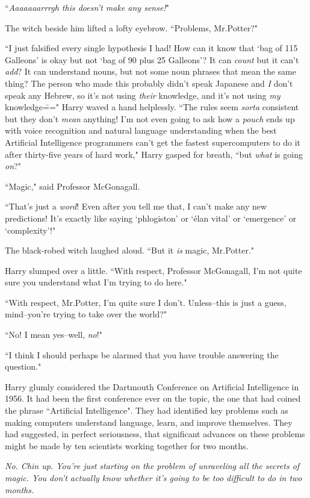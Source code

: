 ``\emph{Aaaaaaarrrgh this doesn't make any sense!}"

The witch beside him lifted a lofty eyebrow. ``Problems, Mr.\?Potter?"

``I just falsified every single hypothesis I had! How can it know that `bag of 115 Galleons' is okay but not `bag of 90 plus 25 Galleons'? It can \emph{count} but it can't \emph{add}? It can understand nouns, but not some noun phrases that mean the same thing? The person who made this probably didn't speak Japanese and \emph{I} don't speak any Hebrew, so it's not using \emph{their} knowledge, and it's not using \emph{my} knowledge\===" Harry waved a hand helplessly. ``The rules seem \emph{sorta} consistent but they don't \emph{mean} anything! I'm not even going to ask how a \emph{pouch} ends up with voice recognition and natural language understanding when the best Artificial Intelligence programmers can't get the fastest supercomputers to do it after thirty-five years of hard work," Harry gasped for breath, ``but \emph{what} is going \emph{on}?"

``Magic," said Professor McGonagall.

``That's just a \emph{word}! Even after you tell me that, I can't make any new predictions! It's exactly like saying `phlogiston' or `élan vital' or `emergence' or `complexity'!"

The black-robed witch laughed aloud. ``But it \emph{is} magic, Mr.\?Potter."

Harry slumped over a little. ``With respect, Professor McGonagall, I'm not quite sure you understand what I'm trying to do here."

``With respect, Mr.\?Potter, I'm quite sure I don't. Unless\---this is just a guess, mind\---you're trying to take over the world?"

``No! I mean yes\---well, \emph{no}!"

``I think I should perhaps be alarmed that you have trouble answering the question."

Harry glumly considered the Dartmouth Conference on Artificial Intelligence in 1956. It had been the first conference ever on the topic, the one that had coined the phrase ``Artificial Intelligence". They had identified key problems such as making computers understand language, learn, and improve themselves. They had suggested, in perfect seriousness, that significant advances on these problems might be made by ten scientists working together for two months.

\emph{No. Chin up. You're just \emph{starting} on the problem of unraveling all the secrets of magic. You don't actually \emph{know} whether it's going to be too difficult to do in two months.}


